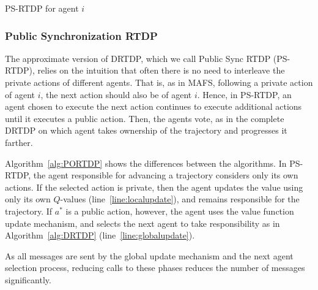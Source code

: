\documentclass[letterpaper]{article} %
\theoremstyle{remark}
\begin{document}
\begin{algorithm}[t!]
\footnotesize
\caption{PS-RTDP for agent $i$}
\label{alg:PORTDP}

\end{algorithm}




\subsubsection{Public Synchronization RTDP}

The approximate version of DRTDP, which we call Public Sync RTDP (PS-RTDP), relies on the intuition that often there is no need to interleave the private actions of different agents. That is, as in MAFS, following a private action of agent $i$, the next action should also be of agent $i$.
Hence, in PS-RTDP, an agent chosen to execute the next action continues to execute additional actions until it executes a public action. Then, the agents vote, as in the complete DRTDP on which agent takes ownership of the trajectory and progresses it farther.

Algorithm~\ref{alg:PORTDP} shows the differences between the algorithms. In PS-RTDP, the agent responsible for advancing a trajectory considers only its own actions. If the selected action is private, then the agent updates the value using only its own $Q$-values (line~\ref{line:localupdate}), and remains responsible for the trajectory. If $a^*$ is a public action, however, the agent uses the value function update mechanism, and selects the next agent to take responsibility as in Algorithm~\ref{alg:DRTDP} (line~\ref{line:globalupdate}).

As all messages are sent by the global update mechanism and the next agent selection process, reducing calls to these phases reduces the number of messages significantly.
\end{document}
